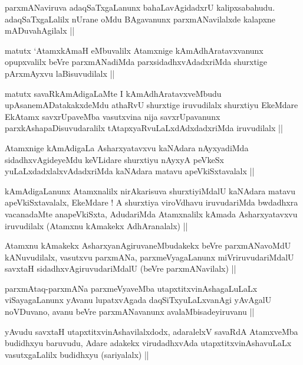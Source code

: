 \begin{artha}
parxmANaviruva adaqSaTxgaLanunx bahaLavAgidadxrU
kalipxsabahudu. adaqSaTxgaLalilx nUrane oMdu BAgavanunx
parxmANavilalxde kalapxne mADuvahAgilalx ||
\end{artha}

\begin{artha}
matutx `AtamxkAmaH eMbuvalilx Atamxnige kAmAdhAratavxvanunx
opupxvalilx beVre parxmANadiMda parxsidadhxvAdadxriMda shurxtige
pArxmAyxvu laBisuvudilalx ||
\end{artha}

\begin{artha}
matutx savaRkAmAdigaLaMte I kAmAdhAratavxveMbudu
upAsanemADatakakxdeMdu athaRvU shurxtige iruvudilalx shurxtiyu
EkeMdare EkAtamx savxrUpaveMba vasutxvina nija savxrUpavanunx
parxkAshapaDisuvudaralilx tAtapxyaRvuLaLxdAdxdadxriMda iruvudilalx ||
\end{artha}


\begin{artha}
Atamxnige kAmAdigaLa Asharxyatavxvu kaNAdara nAyxyadiMda
sidadhxvAgideyeMdu keVLidare shurxtiyu nAyxyA peVkeSx
yuLaLxdadxlalxvAdadxriMda kaNAdara matavu apeVkiSxtavalalx ||
\end{artha}

\begin{artha}
kAmAdigaLanunx Atamxnalilx nirAkarisuva shurxtiyiMdalU kaNAdara matavu
apeVkiSxtavalalx, EkeMdare ! A shurxtiya viroVdhavu iruvudariMda
bwdadhxra vacanadaMte anapeVkiSxta, AdudariMda Atamxnalilx kAmada
Asharxyatavxvu iruvudilalx (Atamxnu kAmakekx AdhAranalalx) ||
\end{artha}

\begin{artha}
Atamxnu kAmakekx AsharxyanAgiruvaneMbudakekx beVre parxmANavoMdU
kANuvudilalx, vasutxvu parxmANa, parxmeVyagaLanunx miVriruvudariMdalU
savxtaH sidadhxvAgiruvudariMdalU (beVre parxmANavilalx) ||
\end{artha}

\begin{artha}
parxmAtaq-parxmANa parxmeVyaveMba utapxtitxvinAshagaLuLaLx
viSayagaLanunx yAvanu lupatxvAgada daqSiTxyuLaLxvanAgi yAvAgalU
noVDuvano, avanu beVre parxmANavanunx avalaMbisadeyiruvanu ||
\end{artha}

\begin{artha}
yAvudu savxtaH utapxtitxvinAshavilalxdodx, adaralelxV savaRdA
AtamxveMba budidhxyu baruvudu, Adare adakekx virudadhxvAda
utapxtitxvinAshavuLaLx vasutxgaLalilx budidhxyu (sariyalalx) ||
\end{artha} 

